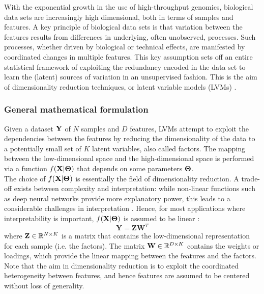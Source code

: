 With the exponential growth in the use of high-throughput genomics, biological data sets are increasingly high dimensional, both in terms of samples and features. A key principle of biological data sets is that variation between the features results from differences in underlying, often unobserved, processes. Such processes, whether driven by biological or technical effects, are manifested by coordinated changes in multiple features. This key assumption sets off an entire statistical framework of exploiting the redundancy encoded in the data set to learn the (latent) sources of variation in an unsupervised fashion. This is the aim of dimensionality reduction techniques, or latent variable models (LVMs) \cite{Komili2008, Stegle2012, Leek2007, Pournara2007, Dai2017, Genevieve2018, Meng2016}.

\subsubsection{General mathematical formulation}
Given a dataset ${\bf Y}$ of $N$ samples and $D$ features, LVMs attempt to exploit the dependencies between the features by reducing the dimensionality of the data to a potentially small set of $K$ latent variables, also called factors. The mapping between the low-dimensional space and the high-dimensional space is performed via a function $f({\bf X}|\mbox{\boldmath $\Theta$})$ that depends on some parameters $\mbox{\boldmath $\Theta$}$.\\
The choice of $f({\bf X}|\mbox{\boldmath $\Theta$})$ is essentially the field of dimensionality reduction. A trade-off exists between complexity and interpretation: while non-linear functions such as deep neural networks provide more explanatory power, this leads to a considerable challenges in interpretation \cite{Zhang2018_NN}. Hence, for most applications where interpretability is important, $f({\bf X}|\mbox{\boldmath $\Theta$})$ is assumed to be linear \cite{XX}:
\begin{equation} \label{eq:linear_model}
	\mathbf{Y} = \mathbf{Z}\mathbf{W}^{T}
\end{equation}
where ${\bf Z} \in \mathbb{R}^{N \times K}$ is a matrix that contains the low-dimensional representation for each sample (i.e. the factors). The matrix ${\bf W} \in \mathbb{R}^{D \times K}$ contains the weights or loadings, which provide the linear mapping between the features and the factors.\\
Note that the aim in dimensionality reduction is to exploit the coordinated heterogeneity between features, and hence features are assumed to be centered without loss of generality.

